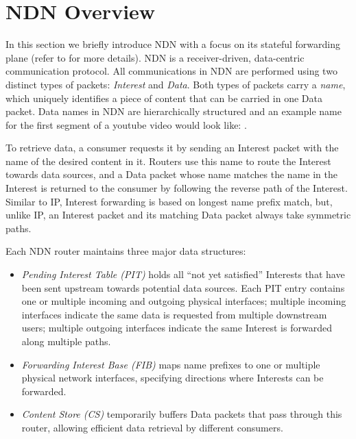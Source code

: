 \section{NDN Overview\label{sec:ccn-intro}}

In this section we briefly introduce NDN with a focus on its stateful forwarding plane (refer to \cite{ndn-conext, ndn-tr, adaptive-forwarding, Yi:2013:A-Case-for-Stateful} for more details).
NDN is a receiver-driven, data-centric communication protocol.
All communications in NDN are performed using two distinct types of packets: \textit{Interest} and \textit{Data}. Both types of packets carry a \textit{name}, which uniquely identifies a piece of content that can be carried in one Data packet. Data names in NDN are hierarchically structured and an example name for the first segment of a youtube video would look like: .

To retrieve data, a consumer requests it by sending an Interest packet with the name of the desired content in it.
Routers use this name to route the Interest towards data sources, and a Data packet whose name matches the name in the Interest is returned to the consumer by following the reverse path of the Interest. Similar to IP, Interest forwarding is based on longest name prefix match, but, unlike IP, an Interest packet and its matching Data packet always take symmetric paths.

Each NDN router maintains three major data structures:
\begin{itemize}
\item \textit{Pending Interest Table (PIT)} holds all ``not yet satisfied'' Interests that have been sent upstream towards potential data sources. Each PIT entry contains one or multiple incoming and outgoing physical interfaces; multiple incoming interfaces indicate the same data is requested from multiple downstream users; multiple outgoing interfaces indicate the same Interest is forwarded along multiple paths.
\item \textit{Forwarding Interest Base (FIB)} maps name prefixes to one or multiple physical network interfaces, specifying directions where Interests can be forwarded. 
\item \textit{Content Store (CS)} temporarily buffers Data packets that pass through this router, allowing efficient data retrieval by different consumers.
\end{itemize}

